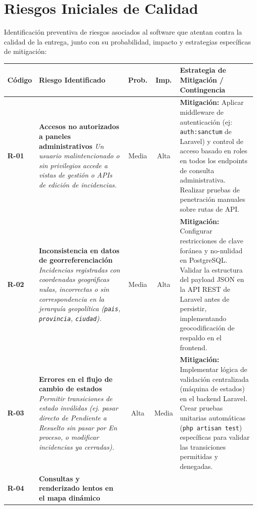 \section{Riesgos Iniciales de Calidad}

Identificación preventiva de riesgos asociados al software que atentan contra la calidad de la entrega, junto con su probabilidad, impacto y estrategias específicas de mitigación:

\begin{table}[H]
\centering
\small
\begin{tabularx}{\textwidth}{l X c c X}
\toprule
\textbf{Código} & \textbf{Riesgo Identificado} & \textbf{Prob.} & \textbf{Imp.} & \textbf{Estrategia de Mitigación / Contingencia} \\
\midrule
\textbf{R-01} & 
\textbf{Accesos no autorizados a paneles administrativos} \newline 
\textit{Un usuario malintencionado o sin privilegios accede a vistas de gestión o APIs de edición de incidencias.} & 
Media & 
Alta & 
\textbf{Mitigación:} Aplicar middleware de autenticación (ej: \texttt{auth:sanctum} de Laravel) y control de acceso basado en roles en todos los endpoints de consulta administrativa. Realizar pruebas de penetración manuales sobre rutas de API. \\
\midrule
\textbf{R-02} & 
\textbf{Inconsistencia en datos de georreferenciación} \newline 
\textit{Incidencias registradas con coordenadas geográficas nulas, incorrectas o sin correspondencia en la jerarquía geopolítica (\texttt{pais}, \texttt{provincia}, \texttt{ciudad}).} & 
Media & 
Alta & 
\textbf{Mitigación:} Configurar restricciones de clave foránea y no-nulidad en PostgreSQL. Validar la estructura del payload JSON en la API REST de Laravel antes de persistir, implementando geocodificación de respaldo en el frontend. \\
\midrule
\textbf{R-03} & 
\textbf{Errores en el flujo de cambio de estados} \newline 
\textit{Permitir transiciones de estado inválidas (ej. pasar directo de Pendiente a Resuelto sin pasar por En proceso, o modificar incidencias ya cerradas).} & 
Alta & 
Media & 
\textbf{Mitigación:} Implementar lógica de validación centralizada (máquina de estados) en el backend Laravel. Crear pruebas unitarias automáticas (\texttt{php artisan test}) específicas para validar las transiciones permitidas y denegadas. \\
\midrule
\textbf{R-04} & 
\textbf{Consultas y renderizado lentos en el mapa dinámico} \newline 

\end{tabularx}
\end{table}
